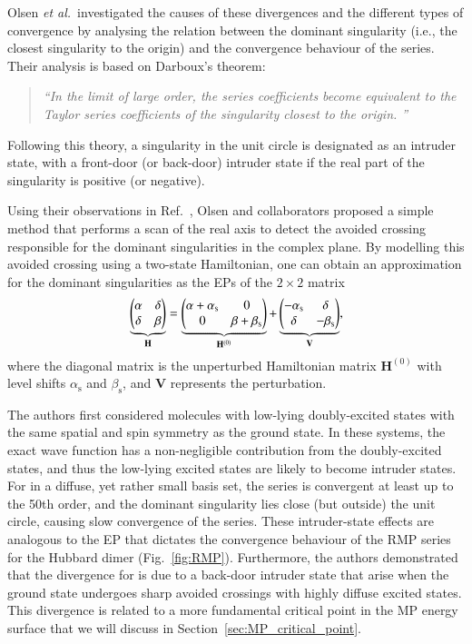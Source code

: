 \documentclass[aps,prb,reprint,noshowkeys,linenumbers,superscriptaddress]{revtex4-1}
\newcommand{\latin}[1]{#1}
\newcommand{\ie}{\latin{i.e.}}
\newcommand{\etal}{\textit{et al.}}
\newcommand{\bH}{\mathbf{H}}
\newcommand{\bV}{\mathbf{V}}
\begin{document}
Olsen \etal\ investigated the causes of these divergences and the different types of convergence by
analysing the relation between the dominant singularity (\ie, the closest singularity to the origin) 
and the convergence behaviour of the series.\cite{Olsen_2000} 
Their analysis is based on Darboux's theorem: \cite{Goodson_2011}
\begin{quote}
	\textit{``In the limit of large order, the series coefficients become equivalent to the Taylor series coefficients of the singularity closest to the origin. ''}
\end{quote}
Following this theory, a singularity in the unit circle is designated as an intruder state, 
with a front-door (or back-door) intruder state if the real part of the singularity is positive (or negative).

Using their observations in Ref.~, Olsen and collaborators proposed 
a simple method that performs a scan of the real axis to detect the avoided crossing responsible 
for the dominant singularities in the complex plane. \cite{Olsen_2000} 
By modelling this avoided crossing using a two-state Hamiltonian, one can obtain an approximation for
the dominant singularities as the EPs of the $2\times2$ matrix
\begin{equation}
	\label{eq:Olsen_2x2}
    \underbrace{\mqty(\alpha & \delta \\ \delta & \beta )}_{\bH} 
    = \underbrace{\mqty(\alpha + \alpha_{\text{s}} & 0 \\ 0 & \beta + \beta_{\text{s}} )}_{\bH^{(0)}} 
    + \underbrace{\mqty( -\alpha_{\text{s}} & \delta \\ \delta & - \beta_{\text{s}})}_{\bV},
\end{equation}
where the diagonal matrix is the unperturbed Hamiltonian matrix $\bH^{(0)}$ with level shifts
$\alpha_{\text{s}}$ and $\beta_{\text{s}}$, and $\bV$ represents the perturbation.

The authors first considered molecules with low-lying doubly-excited states with the same spatial
and spin symmetry as the ground state. \cite{Olsen_2000}
In these systems, the exact wave function has a non-negligible contribution from the doubly-excited states, 
and thus the low-lying excited states are likely to become intruder states. 
For  in a diffuse, yet rather small basis set, the series is convergent at least up to the 50th order, and
the dominant singularity lies close (but outside) the unit circle, causing slow convergence of the series.
These intruder-state effects are analogous to the EP that dictates the convergence behaviour of 
the RMP series for the Hubbard dimer (Fig.~\ref{fig:RMP}).
Furthermore, the authors demonstrated that the divergence for  is due to a back-door intruder state
that arise when the ground state undergoes sharp avoided crossings with highly diffuse excited states.
This divergence is related to a more fundamental critical point in the MP energy surface that we will
discuss in Section~\ref{sec:MP_critical_point}.
\end{document}
